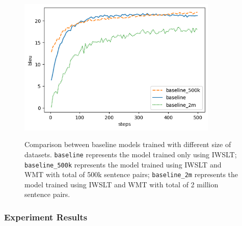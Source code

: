 \begin{figure}[t]
    {\includegraphics[width=0.85\textwidth]{img/baseline.png}}
    \centering
    \caption[Comparison between baseline models trained with different size of datasets.]{
        Comparison between baseline models trained with different size of datasets. \texttt{baseline} represents the model trained only using IWSLT; \texttt{baseline\_500k} represents the model trained using IWSLT and WMT with total of 500k sentence pairs; \texttt{baseline\_2m} represents the model trained using IWSLT and WMT with total of 2 million sentence pairs.}
    \label{img:basecomp}
\end{figure}

\subsubsection{Experiment Results}


